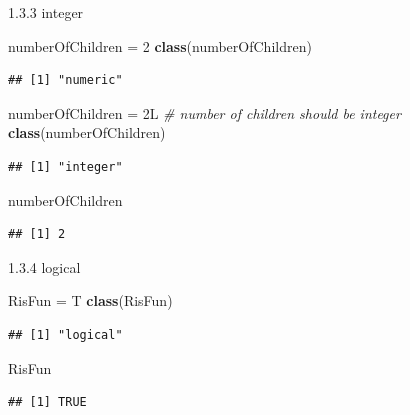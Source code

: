 \documentclass[
  ignorenonframetext,
]{beamer}
\newenvironment{Shaded}{\begin{snugshade}}{\end{snugshade}}
\newcommand{\CommentTok}[1]{\textcolor[rgb]{0.56,0.35,0.01}{\textit{#1}}}
\newcommand{\DecValTok}[1]{\textcolor[rgb]{0.00,0.00,0.81}{#1}}
\newcommand{\FunctionTok}[1]{\textcolor[rgb]{0.13,0.29,0.53}{\textbf{#1}}}
\newcommand{\NormalTok}[1]{#1}
\newcommand{\OtherTok}[1]{\textcolor[rgb]{0.56,0.35,0.01}{#1}}
\begin{document}
\begin{frame}[fragile]{1.3.3 integer}
\protect\hypertarget{integer}{}
\begin{Shaded}
\begin{Highlighting}[]
\NormalTok{numberOfChildren }\OtherTok{=} \DecValTok{2}
\FunctionTok{class}\NormalTok{(numberOfChildren)}
\end{Highlighting}
\end{Shaded}

\begin{verbatim}
## [1] "numeric"
\end{verbatim}

\begin{Shaded}
\begin{Highlighting}[]
\NormalTok{numberOfChildren }\OtherTok{=}\NormalTok{ 2L }\CommentTok{\# number of children should be integer}
\FunctionTok{class}\NormalTok{(numberOfChildren)}
\end{Highlighting}
\end{Shaded}

\begin{verbatim}
## [1] "integer"
\end{verbatim}

\begin{Shaded}
\begin{Highlighting}[]
\NormalTok{numberOfChildren}
\end{Highlighting}
\end{Shaded}

\begin{verbatim}
## [1] 2
\end{verbatim}
\end{frame}

\begin{frame}[fragile]{1.3.4 logical}
\protect\hypertarget{logical}{}
\begin{Shaded}
\begin{Highlighting}[]
\NormalTok{RisFun }\OtherTok{=}\NormalTok{ T}
\FunctionTok{class}\NormalTok{(RisFun)}
\end{Highlighting}
\end{Shaded}

\begin{verbatim}
## [1] "logical"
\end{verbatim}

\begin{Shaded}
\begin{Highlighting}[]
\NormalTok{RisFun}
\end{Highlighting}
\end{Shaded}

\begin{verbatim}
## [1] TRUE
\end{verbatim}
\end{frame}
\end{document}
